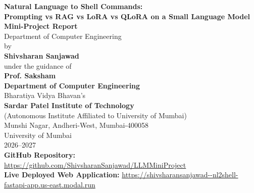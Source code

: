 \documentclass[11pt,a4paper]{report}
\begin{document}
\begin{titlepage}
    \centering
    \vspace*{0.5cm}
    
    {\LARGE \textbf{Natural Language to Shell Commands:}}\\[0.3cm]
    {\LARGE \textbf{Prompting vs RAG vs LoRA vs QLoRA on a Small Language Model}}\\[1.2cm]
    
    {\Large \textbf{Mini-Project Report}}\\[0.3cm]
    {\large Department of Computer Engineering}\\[1.5cm]
    
    {\large by}\\[0.3cm]
    {\Large \textbf{Shivsharan Sanjawad}}\\[1.5cm]
    
    {\large under the guidance of}\\[0.3cm]
    {\Large \textbf{Prof. Saksham}}\\[1.8cm]
    
    {\Large \textbf{Department of Computer Engineering}}\\[0.2cm]
    {\large Bharatiya Vidya Bhavan's}\\[0.2cm]
    {\Large \textbf{Sardar Patel Institute of Technology}}\\[0.2cm]
    {\normalsize (Autonomous Institute Affiliated to University of Mumbai)}\\[0.1cm]
    {\normalsize Munshi Nagar, Andheri-West, Mumbai-400058}\\[0.1cm]
    {\normalsize University of Mumbai}\\[0.2cm]
    {\large 2026--2027}\\[1.0cm]
    
    {\normalsize \textbf{GitHub Repository:} \url{https://github.com/ShivsharanSanjawad/LLMMiniProject}}\\[0.2cm]
    {\normalsize \textbf{Live Deployed Web Application:} \url{https://shivsharansanjawad--nl2shell-fastapi-app.us-east.modal.run}}
\end{titlepage}

\end{document}

